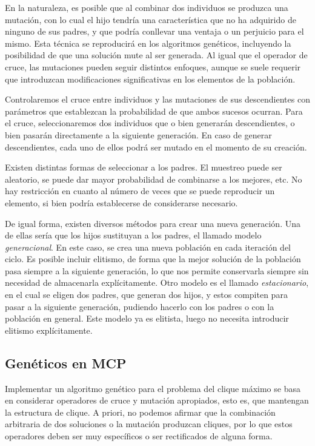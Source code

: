 En la naturaleza, es posible que al combinar dos individuos se produzca una mutación,
con lo cual el hijo tendría una característica que no ha adquirido de ninguno de sus
padres, y que podría conllevar una ventaja o un perjuicio para el mismo. Esta técnica
se reproducirá en los algoritmos genéticos, incluyendo la posibilidad de que una
solución mute al ser generada. Al igual que el operador de cruce, las mutaciones
pueden seguir distintos enfoques, aunque se suele requerir que introduzcan modificaciones
significativas en los elementos de la población.

Controlaremos el cruce entre individuos y las mutaciones de sus descendientes con
parámetros que establezcan la probabilidad de que ambos sucesos ocurran. Para el
cruce, seleccionaremos dos individuos que o bien generarán descendientes, o bien
pasarán directamente a la siguiente generación. En caso de generar descendientes,
cada uno de ellos podrá ser mutado en el momento de su creación.

Existen distintas formas de seleccionar a los padres. El muestreo puede ser aleatorio,
se puede dar mayor probabilidad de combinarse a los mejores, etc. No hay restricción
en cuanto al número de veces que se puede reproducir un elemento, si bien podría
establecerse de considerarse necesario.

De igual forma, existen diversos métodos para crear una nueva generación. Una de
ellas sería que los hijos sustituyan a los padres, el llamado modelo \textit{generacional}.
En este caso, se crea una nueva población en cada iteración del ciclo. Es posible
incluir elitismo, de forma que la mejor solución de la población pasa siempre a
la siguiente generación, lo que nos permite conservarla siempre sin necesidad de
almacenarla explícitamente. Otro modelo es el llamado \textit{estacionario}, en
el cual se eligen dos padres, que generan dos hijos, y estos compiten para pasar a la
siguiente generación, pudiendo hacerlo con los padres o con la población en general.
Este modelo ya es elitista, luego no necesita introducir elitismo explícitamente.

\subsection{Genéticos en MCP}

Implementar un algoritmo genético para el problema del clique máximo se basa en
considerar operadores de cruce y mutación apropiados, esto es, que mantengan la
estructura de clique. A priori, no podemos afirmar que la combinación arbitraria
de dos soluciones o la mutación produzcan cliques, por lo que estos operadores
deben ser muy específicos o ser rectificados de alguna forma.

